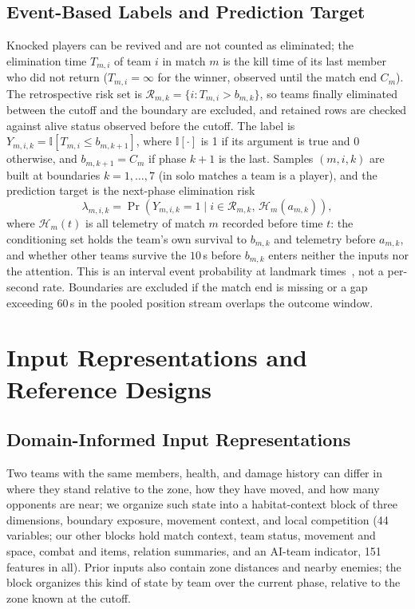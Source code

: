\documentclass[sigconf,anonymous]{acmart}
\begin{document}
\subsection{Event-Based Labels and Prediction Target}
\label{sec:method:labels}
Knocked players can be revived and are not counted as eliminated; the elimination time $T_{m,i}$ of team $i$ in match $m$ is the kill time of its last member who did not return ($T_{m,i}=\infty$ for the winner, observed until the match end $C_m$). The retrospective risk set is $\mathcal{R}_{m,k}=\{i:T_{m,i}>b_{m,k}\}$, so teams finally eliminated between the cutoff and the boundary are excluded, and retained rows are checked against alive status observed before the cutoff. The label is $Y_{m,i,k}=\mathbb{I}[T_{m,i}\le b_{m,k+1}]$, where $\mathbb{I}[\cdot]$ is 1 if its argument is true and 0 otherwise, and $b_{m,k+1}=C_m$ if phase $k+1$ is the last. Samples $(m,i,k)$ are built at boundaries $k=1,\dots,7$ (in solo matches a team is a player), and the prediction target is the next-phase elimination risk
\begin{equation}
\lambda_{m,i,k}=\Pr\!\left(Y_{m,i,k}=1 \mid i\in\mathcal{R}_{m,k},\,\mathcal{H}_{m}(a_{m,k})\right),
\label{eq:hazard}
\end{equation}
where $\mathcal{H}_{m}(t)$ is all telemetry of match $m$ recorded before time $t$: the conditioning set holds the team's own survival to $b_{m,k}$ and telemetry before $a_{m,k}$, and whether other teams survive the $10$\,s before $b_{m,k}$ enters neither the inputs nor the attention. This is an interval event probability at landmark times~\cite{vanHouwelingen07}, not a per-second rate. Boundaries are excluded if the match end is missing or a gap exceeding 60\,s in the pooled position stream overlaps the outcome window.

\section{Input Representations and Reference Designs}
\label{sec:method:design}
\subsection{Domain-Informed Input Representations}
\label{sec:method:representation}
Two teams with the same members, health, and damage history can differ in where they stand relative to the zone, how they have moved, and how many opponents are near; we organize such state into a habitat-context block of three dimensions, boundary exposure, movement context, and local competition (44 variables; our other blocks hold match context, team status, movement and space, combat and items, relation summaries, and an AI-team indicator, 151 features in all). Prior inputs also contain zone distances and nearby enemies; the block organizes this kind of state by team over the current phase, relative to the zone known at the cutoff.
\end{document}
